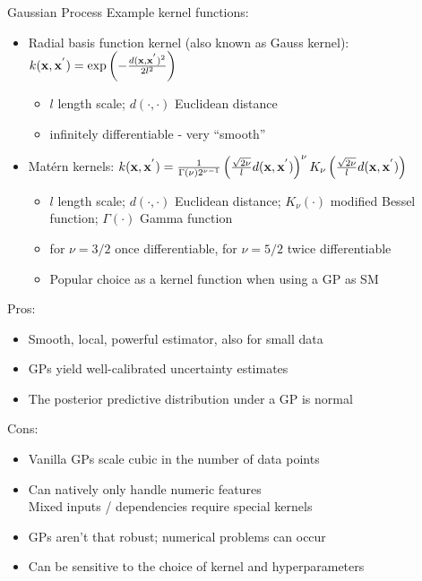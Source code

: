 \documentclass[11pt,compress,t,notes=noshow, xcolor=table]{beamer}
\begin{document}
\begin{vbframe}{Gaussian Process}
Example kernel functions:
\vspace{1em}
\begin{itemize}
  \item Radial basis function kernel (also known as Gauss kernel): $k(\mathbf{x}, \mathbf{x}^{'})=\exp \left(-\frac{d(\mathbf{x}, \mathbf{x}^{'})^2}{2 l^2}\right)$
  \begin{itemize}
    \item $l$ length scale; $d(\cdot, \cdot)$ Euclidean distance
    \item infinitely differentiable - very \enquote{smooth}
  \end{itemize}
  \item Matérn kernels: $k(\mathbf{x}, \mathbf{x}^{'})=\frac{1}{\Gamma(\nu) 2^{\nu-1}}\left(\frac{\sqrt{2 \nu}}{l} d(\mathbf{x}, \mathbf{x}^{'})\right)^\nu K_\nu\left(\frac{\sqrt{2 \nu}}{l} d(\mathbf{x}, \mathbf{x}^{'})\right)$
  \begin{itemize}
    \item $l$ length scale; $d(\cdot, \cdot)$ Euclidean distance; $K_\nu(\cdot)$ modified Bessel function; $\Gamma(\cdot)$ Gamma function \item for $\nu = 3/2$ once differentiable, for $\nu = 5/2$ twice differentiable
    \item Popular choice as a kernel function when using a GP as SM
  \end{itemize}
\end{itemize}

\framebreak



\framebreak

Pros:
\begin{itemize}
  \item Smooth, local, powerful estimator, also for small data
  \item GPs yield well-calibrated uncertainty estimates
  \item The posterior predictive distribution under a GP is normal
\end{itemize}

Cons:
\begin{itemize}
  \item Vanilla GPs scale cubic in the number of data points
  \item Can natively only handle numeric features\\
    Mixed inputs / dependencies require special kernels
  \item GPs aren't that robust; numerical problems can occur
  \item Can be sensitive to the choice of kernel and hyperparameters
\end{itemize}

\end{vbframe}
\end{document}
